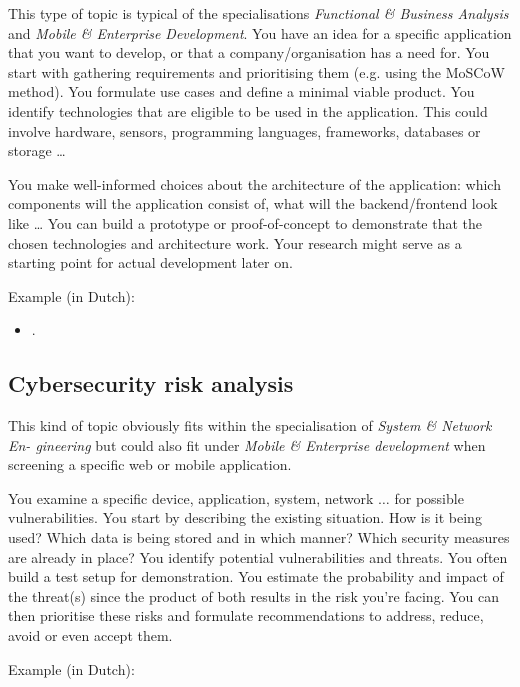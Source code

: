 This type of topic is typical of the specialisations \emph{Functional \& Business Analysis} and \emph{Mobile \& Enterprise Development}. You have an idea for a specific application that you want to develop, or that a company/organisation has a need for. You start with gathering requirements and prioritising them (e.g. using the MoSCoW method). You formulate use cases and define a minimal viable product. You identify technologies that are eligible to be used in the application. This could involve hardware, sensors, programming languages, frameworks, databases or storage {\ldots}

You make well-informed choices about the architecture of the application: which components will the application consist of, what will the backend/frontend look like {\ldots} You can build a prototype or proof-of-concept to demonstrate that the chosen technologies and architecture work. Your research might serve as a starting point for actual development later on.

Example (in Dutch):

\begin{itemize}
	\item {} \autocite{VanDerPlaetsen2013}.
\end{itemize}

\subsection{Cybersecurity risk analysis}%
\label{ssec:thesis_type_cybersecurity_risk_analysis}

This kind of topic obviously fits within the specialisation of \emph{System \& Network En-
gineering} but could also fit under \emph{Mobile \& Enterprise development} when screening a specific web or mobile application.

You examine a specific device, application, system, network {$\ldots$} for possible vulnerabilities. You start by describing the existing
situation. How is it being used? Which data is being stored and in which manner? Which security measures are already in place? You identify
potential vulnerabilities and threats. You often build a test setup for
demonstration. You estimate the probability and impact of the threat(s) since the product of both results in the risk you're facing. You can then
prioritise these risks and formulate recommendations to address, reduce, avoid or even accept them.

Example (in Dutch):

